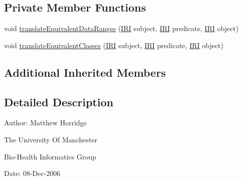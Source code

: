 \subsection*{Private Member Functions}
\begin{DoxyCompactItemize}
\item 
void \hyperlink{classorg_1_1coode_1_1owlapi_1_1rdfxml_1_1parser_1_1_t_p_equivalent_class_handler_ab2d7f72cf81cb79a2e1e659818352b2e}{translate\-Equivalent\-Data\-Ranges} (\hyperlink{classorg_1_1semanticweb_1_1owlapi_1_1model_1_1_i_r_i}{I\-R\-I} subject, \hyperlink{classorg_1_1semanticweb_1_1owlapi_1_1model_1_1_i_r_i}{I\-R\-I} predicate, \hyperlink{classorg_1_1semanticweb_1_1owlapi_1_1model_1_1_i_r_i}{I\-R\-I} object)
\item 
void \hyperlink{classorg_1_1coode_1_1owlapi_1_1rdfxml_1_1parser_1_1_t_p_equivalent_class_handler_aec3f8dbf7a6fbc0f2646cb02ee4eeb45}{translate\-Equivalent\-Classes} (\hyperlink{classorg_1_1semanticweb_1_1owlapi_1_1model_1_1_i_r_i}{I\-R\-I} subject, \hyperlink{classorg_1_1semanticweb_1_1owlapi_1_1model_1_1_i_r_i}{I\-R\-I} predicate, \hyperlink{classorg_1_1semanticweb_1_1owlapi_1_1model_1_1_i_r_i}{I\-R\-I} object)
\end{DoxyCompactItemize}
\subsection*{Additional Inherited Members}


\subsection{Detailed Description}
Author\-: Matthew Horridge\par
 The University Of Manchester\par
 Bio-\/\-Health Informatics Group\par
 Date\-: 08-\/\-Dec-\/2006\par
\par
 

